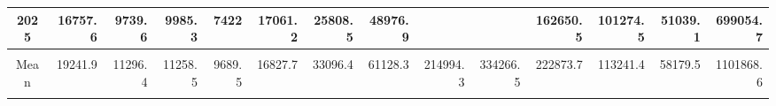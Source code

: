 \begin{longtable}[t]{crrrrrrrrrrrrr}
2025 & 16757.6 & 9739.6 & 9985.3 & 7422 & 17061.2 & 25808.5 & 48976.9 & \cellcolor{green}{88544.9} & \cellcolor{green}{159794.5} & 162650.5 & 101274.5 & 51039.1 & 699054.7\\
\midrule
\cellcolor{red}{Max} & \cellcolor{red}{35143.9} & \cellcolor{red}{20344.7} & \cellcolor{red}{20350.2} & \cellcolor{red}{14651.6} & \cellcolor{red}{25276.9} & \cellcolor{red}{70458.8} & \cellcolor{red}{86307.8} & \cellcolor{red}{392612} & \cellcolor{red}{653959.5} & \cellcolor{red}{384780.8} & \cellcolor{red}{209938.4} & \cellcolor{red}{127915.4} & \cellcolor{red}{1832953.5}\\
Mean & 19241.9 & 11296.4 & 11258.5 & 9689.5 & 16827.7 & 33096.4 & 61128.3 & 214994.3 & 334266.5 & 222873.7 & 113241.4 & 58179.5 & 1101868.6\\
\cellcolor{green}{Min} & \cellcolor{green}{10899.4} & \cellcolor{green}{7068} & \cellcolor{green}{6323.6} & \cellcolor{green}{7349} & \cellcolor{green}{9996.1} & \cellcolor{green}{17355.4} & \cellcolor{green}{45388.5} & \cellcolor{green}{88544.9} & \cellcolor{green}{159794.5} & \cellcolor{green}{110157.4} & \cellcolor{green}{57448.6} & \cellcolor{green}{24164.5} & \cellcolor{green}{656400.5}\\*
\end{longtable}
